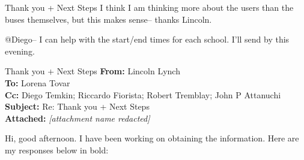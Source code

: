 {\begin{emailbox}{Thank you + Next Steps}
    \vspace{1em}
    I think I am thinking more about the users than the buses themselves, but this makes sense-- thanks Lincoln. \vspace{1em}

    @Diego-- I can help with the start/end times for each school. I'll send by this evening. 
\end{emailbox}

\begin{emailbox}{Thank you + Next Steps}
    \textbf{From:} Lincoln Lynch \\
    \textbf{To:} Lorena Tovar \\
    \textbf{Cc:} Diego Temkin; Riccardo Fiorista; Robert Tremblay; John P Attanuchi \\
    \textbf{Subject:} Re: Thank you + Next Steps \\
    \textbf{Attached:} \textit{[attachment name redacted]}

    \vspace{1em}
    Hi, good afternoon. I have been working on obtaining the information. Here are my responses below in bold:


\end{emailbox}}
